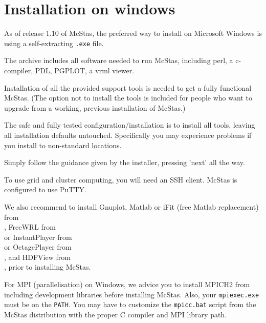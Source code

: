 \section{Installation on windows}
\label{s:win32_install}
As of release 1.10 of McStas, the preferred way to install on
Microsoft Windows is using a self-extracting \texttt{.exe} file.

\noindent The archive includes all software needed to run McStas, including perl, a
c-compiler, PDL, PGPLOT, a vrml viewer.

\noindent Installation of all the provided support tools is needed to get a fully
functional McStas. (The option not to install the tools is included for people who want to
upgrade from a working, previous installation of McStas.)

\noindent The safe and fully tested configuration/installation is to install all
tools, leaving all installation defaults untouched. Specifically you
may experience problems if you install to non-standard locations.

\noindent Simply follow the guidance given by the installer, pressing 'next' all
the way.

\noindent To use grid and cluster computing, you will need an SSH client. McStas is configured to
use PuTTY.

\noindent We also recommend to install Gnuplot, Matlab or 
iFit (free Matlab replacement) from \\, 
FreeWRL from \\
or InstantPlayer from \\ 
or OctagePlayer from \\, 
and HDFView from \\, 
prior to installing McStas.

\noindent For MPI (parallelisation) on Windows, we advice you to install MPICH2 from  including development libraries before installing McStas. Also, your \verb+mpiexec.exe+ must be on the \verb+PATH+. You may have to customize the \verb+mpicc.bat+ script from the McStas distribution with the proper C compiler and MPI library path.

